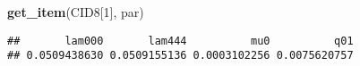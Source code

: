 \documentclass[
]{article}
\newenvironment{Shaded}{\begin{snugshade}}{\end{snugshade}}
\newcommand{\DecValTok}[1]{\textcolor[rgb]{0.00,0.00,0.81}{#1}}
\newcommand{\FunctionTok}[1]{\textcolor[rgb]{0.13,0.29,0.53}{\textbf{#1}}}
\newcommand{\NormalTok}[1]{#1}
\newcommand{\SpecialCharTok}[1]{\textcolor[rgb]{0.81,0.36,0.00}{\textbf{#1}}}
\newcommand{\StringTok}[1]{\textcolor[rgb]{0.31,0.60,0.02}{#1}}
\begin{document}
\begin{Shaded}
\begin{Highlighting}[]
\FunctionTok{get\_item}\NormalTok{(CID8[}\DecValTok{1}\NormalTok{], }\StringTok{\textquotesingle{}par\textquotesingle{}}\NormalTok{)}
\end{Highlighting}
\end{Shaded}

\begin{verbatim}
##       lam000       lam444          mu0          q01 
## 0.0509438630 0.0509155136 0.0003102256 0.0075620757
\end{verbatim}

\begin{Shaded}
\end{Shaded}
\end{document}
